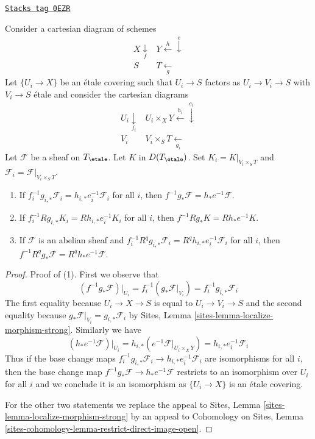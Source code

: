 \begin{lemma}
\label{etale-cohomology-lemma-base-change-local}
\href{https://stacks.math.columbia.edu/tag/0EZR}{\texttt{Stacks tag 0EZR}}

Consider a cartesian diagram of schemes
$$
\begin{array}{cc}X \underset{f}{\downarrow} & Y \overset{h}{\longleftarrow}\overset{e}{\downarrow} \\ S & T \underset{g}{\longleftarrow}\end{array}
$$
Let $\{U_i \to X\}$ be an \'etale covering such that $U_i \to S$
factors as $U_i \to V_i \to S$ with $V_i \to S$ \'etale
and consider the cartesian diagrams
$$
\begin{array}{cc}U_i \underset{f_i}{\downarrow} & U_i \times_X Y \overset{h_i}{\longleftarrow}\overset{e_i}{\downarrow} \\ V_i & V_i \times_S T \underset{g_i}{\longleftarrow}\end{array}
$$
Let $\mathcal{F}$ be a sheaf on $T_\etale$. Let $K$ in $D(T_\etale)$.
Set $K_i = K|_{V_i \times_S T}$ and
$\mathcal{F}_i = \mathcal{F}|_{V_i \times_S T}$.
\begin{enumerate}
\item If $f_i^{-1}g_{i, *}\mathcal{F}_i = h_{i, *}e_i^{-1}\mathcal{F}_i$
for all $i$, then $f^{-1}g_*\mathcal{F} = h_*e^{-1}\mathcal{F}$.
\item If $f_i^{-1}Rg_{i, *}K_i = Rh_{i, *}e_i^{-1}K_i$
for all $i$, then $f^{-1}Rg_*K = Rh_*e^{-1}K$.
\item If $\mathcal{F}$ is an abelian sheaf and
$f_i^{-1}R^qg_{i, *}\mathcal{F}_i = R^qh_{i, *}e_i^{-1}\mathcal{F}_i$
for all $i$, then
$f^{-1}R^qg_*\mathcal{F} = R^qh_*e^{-1}\mathcal{F}$.
\end{enumerate}
\end{lemma}

\begin{proof}
Proof of (1). First we observe that
$$
(f^{-1}g_*\mathcal{F})|_{U_i} =
f_i^{-1}(g_*\mathcal{F}|_{V_i}) =
f_i^{-1}g_{i, *}\mathcal{F}_i
$$
The first equality because $U_i \to X \to S$ is equal to
$U_i \to V_i \to S$ and the second equality because
$g_*\mathcal{F}|_{V_i} = g_{i, *}\mathcal{F}_i$ by
Sites, Lemma \ref{sites-lemma-localize-morphism-strong}.
Similarly we have
$$
(h_*e^{-1}\mathcal{F})|_{U_i} =
h_{i, *}(e^{-1}\mathcal{F}|_{U_i \times_X Y}) =
h_{i, *}e_i^{-1}\mathcal{F}_i
$$
Thus if the base change maps
$f_i^{-1}g_{i, *}\mathcal{F}_i \to h_{i, *}e_i^{-1}\mathcal{F}_i$
are isomorphisms for all $i$, then the base change map
$f^{-1}g_*\mathcal{F} \to h_*e^{-1}\mathcal{F}$
restricts to an isomorphism over $U_i$ for all $i$
and we conclude it is an isomorphism as $\{U_i \to X\}$
is an \'etale covering.

\medskip\noindent
For the other two statements we replace the appeal to
Sites, Lemma \ref{sites-lemma-localize-morphism-strong}
by an appeal to
Cohomology on Sites, Lemma
\ref{sites-cohomology-lemma-restrict-direct-image-open}.
\end{proof}

